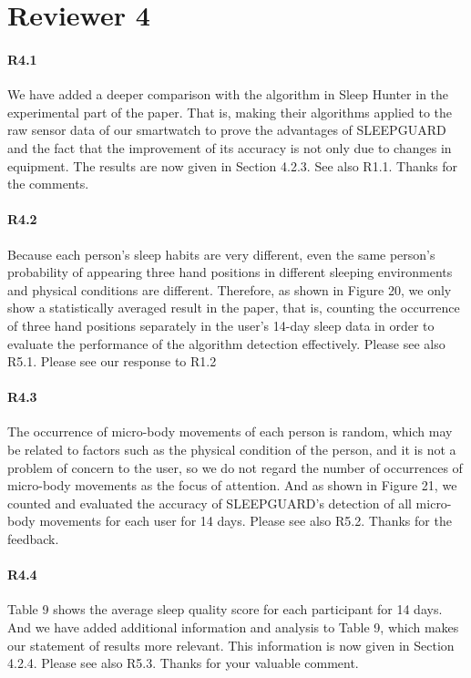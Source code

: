 \section*{Reviewer 4}

\paragraph{R4.1} We have added a deeper comparison with the algorithm in Sleep Hunter in the experimental part of the paper. That is, making their algorithms applied to the raw sensor data of our smartwatch to prove the advantages of SLEEPGUARD and the fact that the improvement of its accuracy is not only due to changes in equipment. The results are now given in Section 4.2.3. See also R1.1. Thanks for the comments.

\paragraph{R4.2} Because each person's sleep habits are very different, even the same person's probability of appearing three hand positions in different sleeping environments and physical conditions are different. Therefore, as shown in Figure 20, we only show a statistically averaged result in the paper, that is, counting the occurrence of three hand positions separately in the user's 14-day sleep data in order to evaluate the performance of the algorithm detection effectively. Please see also R5.1. Please see our response to R1.2
\vspace{-2mm}

\paragraph{R4.3} The occurrence of micro-body movements of each person is random, which may be related to factors such as the physical condition of the person, and it is not a problem of concern to the user, so we do not regard the number of occurrences of micro-body movements as the focus of attention. And as shown in Figure 21, we counted and evaluated the accuracy of SLEEPGUARD's detection of all micro-body movements for each user for 14 days. Please see also R5.2. Thanks for the feedback.
\vspace{-2mm}
\paragraph{R4.4} Table 9 shows the average sleep quality score for each participant for 14 days. And we have added additional information and analysis to Table 9, which makes our statement of results more relevant. This information is now given in Section 4.2.4. Please see also R5.3. Thanks for your valuable comment.

